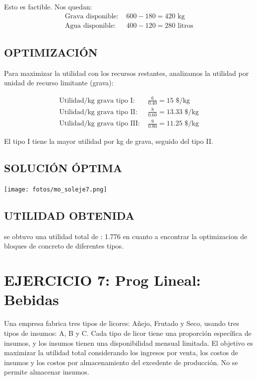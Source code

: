 \documentclass[12pt, a4paper, oneside]{book}
\theoremstyle{definition}
\begin{document}
    Esto es factible. Nos quedan:
    \begin{align}
    \text{Grava disponible: } &600 - 180 = 420 \text{ kg} \\
    \text{Agua disponible: } &400 - 120 = 280 \text{ litros}
    \end{align}

    \subsection{OPTIMIZACIÓN}

    Para maximizar la utilidad con los recursos restantes, analizamos la utilidad por unidad de recurso limitante (grava):

    \begin{align}
    \text{Utilidad/kg grava tipo I: } &\frac{6}{0.40} = 15 \text{ \$/kg} \\
    \text{Utilidad/kg grava tipo II: } &\frac{8}{0.60} = 13.33 \text{ \$/kg} \\
    \text{Utilidad/kg grava tipo III: } &\frac{9}{0.80} = 11.25 \text{ \$/kg}
    \end{align}

    El tipo I tiene la mayor utilidad por kg de grava, seguido del tipo II.

    \subsection{SOLUCIÓN ÓPTIMA}
    \begin{center}
    \texttt{[image: fotos/mo\_soleje7.png]}
    \end{center}

    \subsection{UTILIDAD OBTENIDA}

    se obtuvo una utilidad total de : 1.776 en cuanto a encontrar la optimizacion de bloques de concreto de diferentes tipos.

    \newpage
    \section{EJERCICIO 7: Prog Lineal: Bebidas}
    Una empresa fabrica tres tipos de licores: Añejo, Frutado y Seco, usando tres tipos de insumos: A, B y C. Cada tipo de licor tiene una proporción específica de insumos, y los insumos tienen una disponibilidad mensual limitada. El objetivo es maximizar la utilidad total considerando los ingresos por venta, los costos de insumos y los costos por almacenamiento del excedente de producción. No se permite almacenar insumos.
\end{document}
